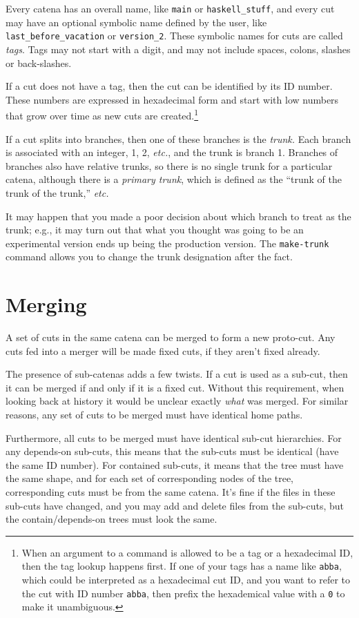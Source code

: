 \documentclass[10pt]{article}
\begin{document}
Every catena has an overall name, like {\tt main} or {\tt haskell\_stuff},
and every cut may have an optional symbolic name defined by the user, like 
{\tt last\_before\_vacation} or {\tt version\_2}. These symbolic names
for cuts are called {\it tags}. Tags may not start with a digit, and
may not include spaces, colons, slashes or back-slashes.

If a cut does not have a tag, then the cut can be identified by its ID
number. These numbers are expressed in hexadecimal form and start with
low numbers that grow over time as new cuts are created.\footnote{When
  an argument to a command is allowed to be a tag or a hexadecimal ID,
  then the tag lookup happens first. If one of your tags has a name
  like {\tt abba}, which could be interpreted as a hexadecimal cut ID,
  and you want to refer to the cut with ID number {\tt abba}, then
  prefix the hexademical value with a {\tt 0} to make it unambiguous.}

If a cut splits into branches, then one of these branches is the 
{\it trunk.} Each branch is associated with an integer, 1, 2, 
{\it etc.}, and the trunk is branch 1. Branches of branches also have
relative trunks, so there is no  
single trunk for a particular catena, although there is a {\it primary
trunk}, which is defined as the ``trunk of the trunk of the trunk,'' {\it etc.}

It may happen that you made a poor decision about which branch to
treat as the trunk; e.g., it may turn out that what you thought was
going to be an experimental version ends up being the production
version. The {\tt make-trunk} command allows you to change the trunk
designation after the fact.

\section{Merging}

A set of cuts in the same catena can be merged to form a new
proto-cut. Any cuts fed into a merger will be made fixed cuts, if they
aren't fixed already. 

The presence of sub-catenas adds a few twists. If a cut is used as a
sub-cut, then it can be merged if and only if it is a fixed cut.
Without this requirement, when looking back at history it would be
unclear exactly {\it what} was merged. For similar reasons, any set of
cuts to be merged must have identical home paths.

Furthermore, all cuts to be merged must have identical sub-cut
hierarchies. For any depends-on sub-cuts, this means that the sub-cuts
must be identical (have the same ID number). For contained sub-cuts,
it means that the tree must have the same shape, and for each set of
corresponding nodes of the tree, corresponding cuts must be from the
same catena. It's fine if the files in these sub-cuts have changed,
and you may add and delete files from the sub-cuts, but the
contain/depends-on trees must look the same.
\end{document}
